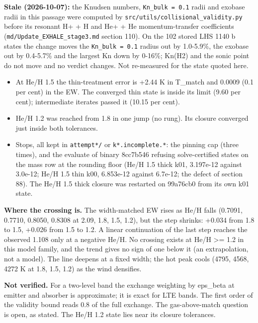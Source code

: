 \documentclass[english,a4paper]{my_memo}
\providecommand{\tightlist}{\setlength{\itemsep}{0pt}\setlength{\parskip}{0pt}}
\begin{document}
\textbf{Stale (2026-10-07):} the Knudsen numbers, \texttt{Kn\_bulk\ =\ 0.1} radii and exobase radii in this passage were computed by \texttt{src/utils/collisional\_validity.py} before its resonant H+ + H and He+ + He momentum-transfer coefficients (\texttt{md/Update\_EXHALE\_stage3.md} section 110). On the 102 stored LHS 1140 b states the change moves the \texttt{Kn\_bulk\ =\ 0.1} radius out by 1.0-5.9\%, the exobase out by 0.4-5.7\% and the largest Kn down by 0-16\%; Kn(H2) and the sonic point do not move and no verdict changes. Not re-measured for the state quoted here.

\begin{itemize}
\tightlist
\item
  At He/H 1.5 the thin-treatment error is +2.44 K in T\_match and 0.0009
  (0.1 per cent) in the EW. The converged thin state is inside its limit
  (9.60 per cent); intermediate iterates passed it (10.15 per cent).
\item
  He/H 1.2 was reached from 1.8 in one jump (no rung). Its closure
  converged just inside both tolerances.
\item
  Stops, all kept in \texttt{attempt*/} or \texttt{k*.incomplete.*}: the pinning cap
  (three times), and the evaluate of binary 8cc7b546 refusing
  solve-certified states on the mass row at the rounding floor (He/H 1.5
  thick k01, 3.197e-12 against 3.0e-12; He/H 1.5 thin k00, 6.853e-12
  against 6.7e-12; the defect of section 88). The He/H 1.5 thick closure
  was restarted on 99a76cb0 from its own k01 state.
\end{itemize}

\textbf{Where the crossing is.} The width-matched EW rises as He/H falls
(0.7091, 0.7710, 0.8050, 0.8308 at 2.09, 1.8, 1.5, 1.2), but the step
shrinks: +0.034 from 1.8 to 1.5, +0.026 from 1.5 to 1.2. A linear
continuation of the last step reaches the observed 1.108 only at a negative
He/H. No crossing exists at He/H \textgreater= 1.2 in this model family, and the trend
gives no sign of one below it (an extrapolation, not a model). The line
deepens at a fixed width; the hot peak cools (4795, 4568, 4272 K at 1.8,
1.5, 1.2) as the wind densifies.

\textbf{Not verified.} For a two-level band the exchange weighting by eps\_beta at
emitter and absorber is approximate; it is exact for LTE bands. The first
order of the validity bound reads 0.8 of the full exchange. The
gas-above-match question is open, as stated. The He/H 1.2 state lies near
its closure tolerances.
\end{document}
